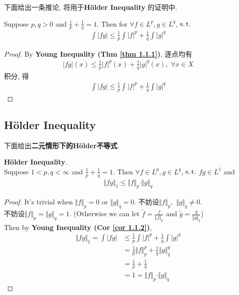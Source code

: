	\vspace{4em}
	下面给出一条推论, 将用于\textbf{H\"{o}lder Inequality} 的证明中.
	\begin{corollary}\label{cor 1.1.2}
		Suppose $p , q > 0$ and $\frac{1}{p} + \frac{1}{q} = 1$. Then for $\forall f \in L^p , g \in L^q$, $\operatorname{s.t.}$
		\begin{align}
			\int{\left| f g \right|} \leq \frac{1}{p} \int{\left| f \right|^p} + \frac{1}{q} \int{\left| g \right|^q}
		\end{align}
		
		\vspace{2em}
		\begin{proof}
			By \textbf{Young Inequality (Thm \ref{thm 1.1.1})}, 逐点均有
			\begin{align}
				\left| fg \right| (x) \leq \frac{1}{p} \left| f \right|^p (x) + \frac{1}{q} \left| g \right|^q (x) , \,\, \forall x \in X
			\end{align}
			积分, 得
			\begin{align}
				\int{\left| f g \right|} \leq \frac{1}{p} \int{\left| f \right|^p} + \frac{1}{q} \int{\left| g \right|^q}
			\end{align}
		\end{proof}
	\end{corollary}

\newpage
\subsection{H\"{o}lder Inequality}
 	下面给出\textbf{二元情形下的H\"{o}lder不等式}.
 	\begin{thm}\label{thm 1.1.3}
 		\textbf{H\"{o}lder Inequality}. \\
 		Suppose $1 < p , q < \infty$ and $\frac{1}{p} + \frac{1}{q} = 1$. Then $\forall f \in L^{p} , g \in L^q$, $\operatorname{s.t.}$ $fg \in L^1$ and
 		\begin{align}
 			\Vert fg \Vert_1 \leq \Vert f \Vert_p \cdot \Vert g \Vert_q
 		\end{align}
 		
 		\vspace{4em}
 		\begin{proof}
 			It's trivial when $\Vert f \Vert_p = 0$ or $\Vert g \Vert_q = 0$. 不妨设$\Vert f \Vert_p, \,\, \Vert g \Vert_q \neq 0$. \\
 			不妨设$\Vert f \Vert_p = \Vert g \Vert_q = 1$. (Otherwise we can let $\widetilde{f} = \frac{f}{\Vert f \Vert_p}$ and $\widetilde{g} = \frac{g}{\Vert g \Vert_q}$) \\
 			Then by \textbf{Young Inequality (Cor \ref{cor 1.1.2})},
 			\begin{align}
 				\Vert fg \Vert_1 
 				= \int{\left| fg \right|}
 				&\leq \frac{1}{p} \int{\left| f \right|^p} + \frac{1}{q} \int{\left| g \right|^q} \\
 				&= \frac{1}{p} \Vert f \Vert_{p}^{p} + \frac{1}{q} \Vert g \Vert_{q}^{q} \\
 				&= \frac{1}{p} + \frac{1}{q} \\
 				&= 1 
 				= \Vert f \Vert_p \cdot \Vert g \Vert_q
 			\end{align}
 		\end{proof}
 	\end{thm}
 
